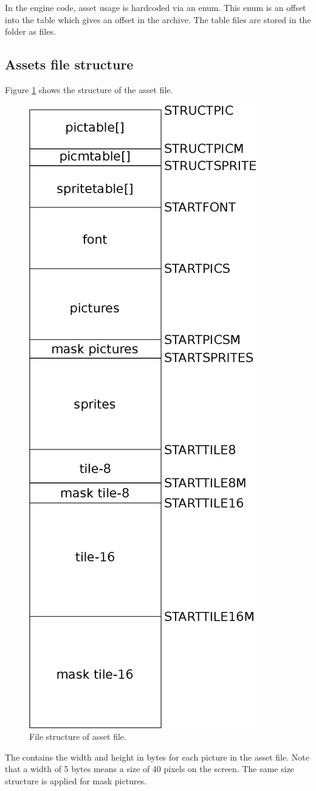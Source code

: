 \documentclass[book.tex]{subfiles}
\begin{document}
 In the engine code, asset usage is hardcoded via an enum. This enum is an offset into the  table which gives an offset in the  archive. The  table files are stored in the  folder as  files.\\

\subsection{Assets file structure}
Figure \ref{fig:asset-creation-pipeline} shows the structure of the  asset file.
\begin{figure}[H]
\centering
 \includegraphics[width=.5\textwidth]{imgs/drawings/graphic_assets.eps}
 \caption{File structure of  asset file.}
 \label{fig:asset-creation-pipeline}
\end{figure}

The  contains the width and height in bytes for each picture in the asset file. Note that a width of 5 bytes means a size of 40 pixels on the screen. The same size structure is applied for mask pictures.\\
\end{document}

